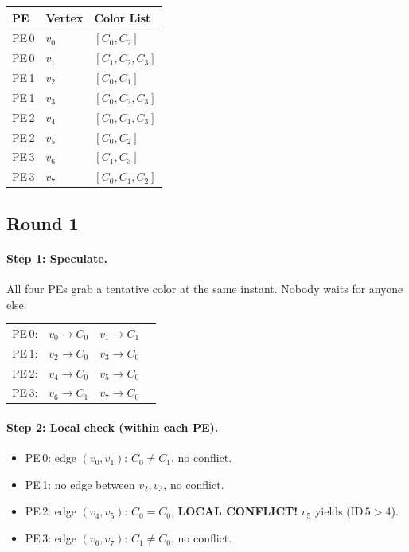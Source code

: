 \documentclass[11pt,letterpaper]{article}
\begin{document}
\begin{center}
\begin{tabular}{lll}
\toprule
PE & Vertex & Color List \\
\midrule
PE\,0 & $v_0$ & $[C_0, C_2]$ \\
PE\,0 & $v_1$ & $[C_1, C_2, C_3]$ \\
\midrule
PE\,1 & $v_2$ & $[C_0, C_1]$ \\
PE\,1 & $v_3$ & $[C_0, C_2, C_3]$ \\
\midrule
PE\,2 & $v_4$ & $[C_0, C_1, C_3]$ \\
PE\,2 & $v_5$ & $[C_0, C_2]$ \\
\midrule
PE\,3 & $v_6$ & $[C_1, C_3]$ \\
PE\,3 & $v_7$ & $[C_0, C_1, C_2]$ \\
\bottomrule
\end{tabular}
\end{center}

\subsection{Round 1}

\paragraph{Step 1: Speculate.}
All four PEs grab a tentative color at the same instant. Nobody waits for anyone else:

\begin{center}
\begin{tabular}{llll}
PE\,0: & $v_0 \to C_0$ & $v_1 \to C_1$ & \\
PE\,1: & $v_2 \to C_0$ & $v_3 \to C_0$ & \\
PE\,2: & $v_4 \to C_0$ & $v_5 \to C_0$ & \\
PE\,3: & $v_6 \to C_1$ & $v_7 \to C_0$ & \\
\end{tabular}
\end{center}

\paragraph{Step 2: Local check (within each PE).}
\begin{itemize}[nosep]
  \item PE\,0: edge $(v_0,v_1)$: $C_0 \neq C_1$, no conflict.
  \item PE\,1: no edge between $v_2,v_3$, no conflict.
  \item PE\,2: edge $(v_4,v_5)$: $C_0 = C_0$, \textcolor{conflictRed}{\textbf{LOCAL CONFLICT!}} $v_5$ yields (ID\,$5 > 4$).
  \item PE\,3: edge $(v_6,v_7)$: $C_1 \neq C_0$, no conflict.
\end{itemize}
\end{document}
